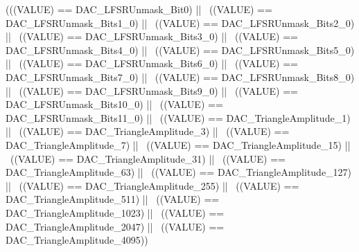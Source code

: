 \begin{DoxyCode}
(((VALUE) == DAC_LFSRUnmask_Bit0) || \
                                                      ((VALUE) == 
      DAC_LFSRUnmask_Bits1_0) || \
                                                      ((VALUE) == 
      DAC_LFSRUnmask_Bits2_0) || \
                                                      ((VALUE) == 
      DAC_LFSRUnmask_Bits3_0) || \
                                                      ((VALUE) == 
      DAC_LFSRUnmask_Bits4_0) || \
                                                      ((VALUE) == 
      DAC_LFSRUnmask_Bits5_0) || \
                                                      ((VALUE) == 
      DAC_LFSRUnmask_Bits6_0) || \
                                                      ((VALUE) == 
      DAC_LFSRUnmask_Bits7_0) || \
                                                      ((VALUE) == 
      DAC_LFSRUnmask_Bits8_0) || \
                                                      ((VALUE) == 
      DAC_LFSRUnmask_Bits9_0) || \
                                                      ((VALUE) == 
      DAC_LFSRUnmask_Bits10_0) || \
                                                      ((VALUE) == 
      DAC_LFSRUnmask_Bits11_0) || \
                                                      ((VALUE) == 
      DAC_TriangleAmplitude_1) || \
                                                      ((VALUE) == 
      DAC_TriangleAmplitude_3) || \
                                                      ((VALUE) == 
      DAC_TriangleAmplitude_7) || \
                                                      ((VALUE) == 
      DAC_TriangleAmplitude_15) || \
                                                      ((VALUE) == 
      DAC_TriangleAmplitude_31) || \
                                                      ((VALUE) == 
      DAC_TriangleAmplitude_63) || \
                                                      ((VALUE) == 
      DAC_TriangleAmplitude_127) || \
                                                      ((VALUE) == 
      DAC_TriangleAmplitude_255) || \
                                                      ((VALUE) == 
      DAC_TriangleAmplitude_511) || \
                                                      ((VALUE) == 
      DAC_TriangleAmplitude_1023) || \
                                                      ((VALUE) == 
      DAC_TriangleAmplitude_2047) || \
                                                      ((VALUE) == 
      DAC_TriangleAmplitude_4095))
\end{DoxyCode}
